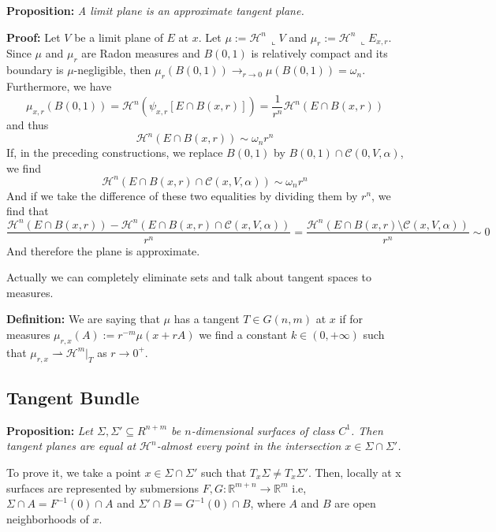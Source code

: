 \vspace{2ex}
\textbf{Proposition:} \textit{A limit plane is an approximate tangent plane.}

\vspace{1ex}
\textbf{Proof:} Let $V$ be a limit plane of $E$ at $x$. Let $\mu:= \mathcal{H}^n
\,\llcorner V$ and $\mu_r:=\mathcal{H}^n\,\llcorner E_{x,r}$. Since $\mu$ and
$\mu_r$ are Radon measures and $B(0,1)$ is relatively compact and its boundary
is $\mu$-negligible, then $\mu_r(B(0,1)) \rightarrow_{r\rightarrow 0}
\mu(B(0,1)) = \omega_n$. Furthermore, we have
\[\mu_{x,r}(B(0,1)) = \mathcal{H}^n(\psi_{x,r}[E\cap B(x, r)]) = \frac{1}{r^n}\mathcal{H}^n(E\cap B(x, r))\]
and thus
\[\mathcal{H}^n(E\cap B(x, r)) \sim \omega_n r^n\]
If, in the preceding constructions, we replace $B(0,1)$ by $B(0,1)\cap\mathcal{C}
(0,V,\alpha)$, we find
\[\mathcal{H}^n(E\cap B(x, r)\cap\mathcal{C}(x,V,\alpha)) \sim \omega_n r^n\]
And if we take the difference of these two equalities by dividing them by $r^n$,
we find that
\[\frac{\mathcal{H}^n(E\cap B(x, r)) - \mathcal{H}^n(E\cap B(x, r)\cap\mathcal{C}(x,V,\alpha))}{r^n} = \frac{\mathcal{H}^n(E\cap B(x, r)\setminus\mathcal{C}(x,V,\alpha))}{r^n} \sim 0\]
And therefore the plane is approximate.

\vspace{2ex}
Actually we can completely eliminate sets and talk about tangent spaces to
measures.

\vspace{1ex}
\textbf{Definition:} We are saying that $\mu$ has a tangent $T\in G(n,m)$ at $x$ if
for measures $\mu_{r,x}(A):=r^{-m}\mu(x+rA)$ we find a constant $k\in(0,+\infty)$
such that $\mu_{r,x}\rightharpoonup \mathcal H^m|_T$ as $r\rightarrow 0^+$.

\subsection{Tangent Bundle}
\textbf{Proposition:} \textit{Let $\Sigma, \Sigma′\subseteq R^{n+m}$ be
$n$-dimensional surfaces of class $C^1$. Then tangent planes are equal at 
$\mathcal H^n$-almost every point in the intersection $x∈\Sigma\cap\Sigma′$.}

\vspace{1ex}
To prove it, we take a point $x\in\Sigma\cap\Sigma'$ such that $T_x\Sigma\neq T_x
\Sigma'$. Then, locally at x surfaces are represented by submersions $F,G:\mathbb
R^{m+n}\rightarrow\mathbb R^m$ i.e, $\Sigma\cap A=F^{-1}(0)\cap A$ and
$\Sigma'\cap B=G^{-1}(0)\cap B$, where $A$ and $B$ are open neighborhoods of $x$.

